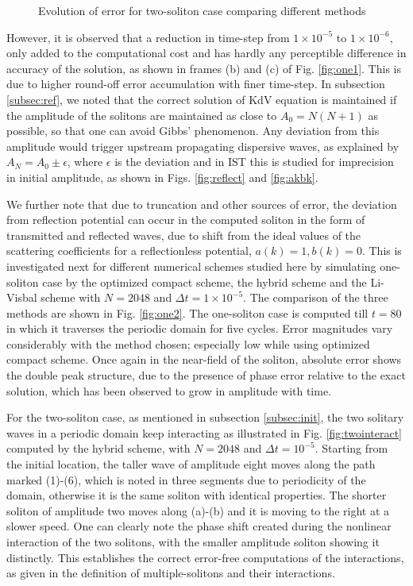 \begin{figure}[h!]
{}
\caption{Evolution of error for two-soliton case comparing different methods}
\label{fig:two2}
\end{figure}

However, it is observed that a reduction in time-step from $1 \times 10^{-5}$ to $1 \times 10^{-6}$, only added to the computational cost and has hardly 
any perceptible difference in accuracy of the solution, as shown in frames (b) and (c) of Fig. \ref{fig:one1}. This is due to higher round-off error accumulation with finer time-step. In subsection \ref{subsec:ref}, we noted that the correct solution of KdV equation is maintained if the amplitude of the 
solitons are maintained as close to $A_0 = N(N+1)$ as possible, so that one can avoid Gibbs' phenomenon. Any deviation from this amplitude would trigger upstream propagating dispersive waves, as explained by $A_N = A_0 \pm \epsilon$, where $\epsilon$ is the deviation and in IST this is studied for imprecision in initial amplitude, as shown in Figs. \ref{fig:reflect} and \ref{fig:akbk}. 

We further note that due to truncation and other sources of error, the deviation from reflection potential can occur in the computed soliton in the form of transmitted and reflected waves, due to shift from the ideal values of the scattering coefficients for a reflectionless potential, $a(k)=1,b(k)=0$. 
This is investigated next for different numerical schemes studied here by simulating one-soliton case by the optimized compact scheme, the hybrid scheme and the Li-Visbal scheme with 
$N=2048$ and $\Delta t = 1 \times 10^{-5}$. The comparison of the three methods are shown in Fig. \ref{fig:one2}.
The one-soliton case is computed till $t=80$ in which it traverses the periodic domain for five cycles.  Error magnitudes vary considerably with the method chosen; especially low while using optimized compact scheme. Once again in the near-field of the soliton, absolute error shows the double peak structure, due to the presence of phase error relative to the exact solution, which has been observed to grow in amplitude with time.

For the two-soliton case, as mentioned in subsection \ref{subsec:init}, the two solitary waves in a periodic domain keep interacting as illustrated in Fig. 
\ref{fig:twointeract} computed by the hybrid scheme, with $N = 2048$ and $\Delta t =10^{-5}$. Starting from the initial location, the taller wave of amplitude eight moves along the path marked (1)-(6), which is noted in three segments due to periodicity of the domain, otherwise it is the same 
soliton with identical properties. The shorter soliton of amplitude two moves along (a)-(b) and it is moving to the right at a slower speed. 
One can clearly note the phase shift created during the nonlinear interaction of the two solitons, with the smaller amplitude soliton showing it distinctly. This establishes the correct error-free computations of the interactions, as given in the definition of multiple-solitons and their
interactions.

